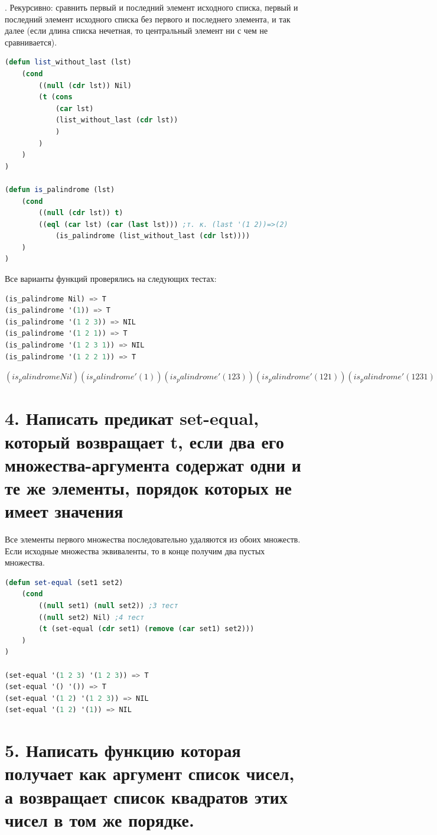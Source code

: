 \documentclass[12pt]{report}
\begin{document}
. Рекурсивно: сравнить первый и последний элемент исходного списка, первый и последний элемент исходного списка без первого и последнего элемента, и так далее (если длина списка нечетная, то центральный элемент ни с чем не сравнивается).

\begin{lstlisting}[language=Lisp]
(defun list_without_last (lst)
	(cond
		((null (cdr lst)) Nil)
		(t (cons 
			(car lst) 
			(list_without_last (cdr lst))
			)
		)
	)
)
	
(defun is_palindrome (lst)
	(cond 
		((null (cdr lst)) t)
		((eql (car lst) (car (last lst))) ;т. к. (last '(1 2))=>(2)
			(is_palindrome (list_without_last (cdr lst))))
	)
)
\end{lstlisting}


Все варианты функций проверялись на следующих тестах:
\begin{lstlisting}[language=Lisp]
(is_palindrome Nil) => T
(is_palindrome '(1)) => T
(is_palindrome '(1 2 3)) => NIL
(is_palindrome '(1 2 1)) => T
(is_palindrome '(1 2 3 1)) => NIL
(is_palindrome '(1 2 2 1)) => T
\end{lstlisting}

$
(is_palindrome Nil)
(is_palindrome '(1))
(is_palindrome '(1 2 3))
(is_palindrome '(1 2 1))
(is_palindrome '(1 2 3 1))
(is_palindrome '(1 2 2 1))
$
\fi

\clearpage
\section*{4. Написать предикат set-equal, который возвращает t, если два его множества-аргумента содержат одни и те же элементы, порядок которых не имеет значения}

Все элементы первого множества последовательно удаляются из обоих множеств. Если исходные множества эквиваленты, то в конце получим два пустых множества.

\begin{lstlisting}[language=Lisp]
(defun set-equal (set1 set2)
	(cond 
		((null set1) (null set2)) ;3 тест
		((null set2) Nil) ;4 тест
		(t (set-equal (cdr set1) (remove (car set1) set2)))
	)
)

(set-equal '(1 2 3) '(1 2 3)) => T
(set-equal '() '()) => T
(set-equal '(1 2) '(1 2 3)) => NIL
(set-equal '(1 2) '(1)) => NIL
\end{lstlisting}


\section*{5. Написать функцию которая получает как аргумент список чисел, а возвращает список квадратов этих чисел в том же порядке.}
\end{document}
